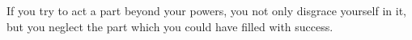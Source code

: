 If you try to act a part beyond  your powers, you not only disgrace yourself in
it, but you neglect the part which you could have filled with success.
